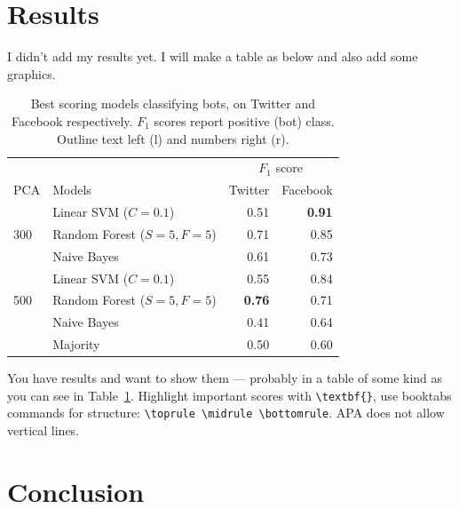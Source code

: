 \documentclass[11pt, a4paper]{article}
\begin{document}
\section{Results}
I didn't add my results yet. I will make a table as below and also add some graphics.
\begin{table}
    \caption{Best scoring models classifying bots, on Twitter and Facebook respectively. $F_1$ scores report positive (bot) class. Outline text left (l) and numbers right (r).}
    \label{tab:results}
    \centering
    \small
    \begin{tabular}{llrr}
        \toprule
                              &                                   & \multicolumn{2}{c}{$F_1$ score} \\
                                                                  \cmidrule{3-4}
        PCA                   &  Models                           &  Twitter        &  Facebook       \\ 
        \midrule
        \multirow{3}{*}{300}  & Linear SVM ($C = 0.1$)            &   0.51          & \textbf{0.91} \\
                              & Random Forest ($S = 5, F = 5$)    &   0.71          & 0.85 \\
                              & Naive Bayes                       &   0.61          & 0.73 \\
        \midrule
        \multirow{3}{*}{500}  & Linear SVM ($C = 0.1$)            &   0.55          & 0.84   \\
                              & Random Forest ($S = 5, F = 5$)    &   \textbf{0.76} & 0.71 \\
                              & Naive Bayes                       &   0.41          & 0.64 \\
        \midrule
                              & Majority                          &   0.50          & 0.60 \\
        \bottomrule
    \end{tabular}
\end{table}

You have results and want to show them --- probably in a table of some kind as you can see in Table~\ref{tab:results}. Highlight important scores with \verb|\textbf{}|, use booktabs commands for structure: \verb|\toprule \midrule \bottomrule|. APA does not allow vertical lines.

\section{Conclusion}
\end{document}
